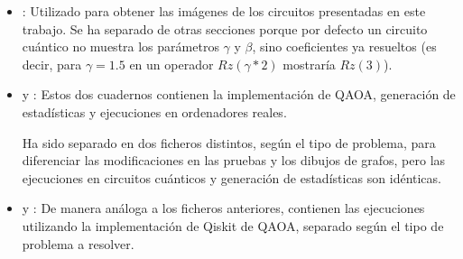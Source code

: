\begin{itemize}
\item {}: Utilizado para obtener las imágenes de los circuitos presentadas en este trabajo.
  Se ha separado de otras secciones porque por defecto un circuito cuántico no muestra los parámetros $\gamma$ y $\beta$, sino coeficientes ya resueltos (es decir, para $\gamma = 1.5$ en un operador $Rz(\gamma*2)$ mostraría $Rz(3)$).

\item {} y : Estos dos cuadernos contienen la implementación de QAOA, generación de estadísticas y ejecuciones en ordenadores reales.
  
  Ha sido separado en dos ficheros distintos, según el tipo de problema, para diferenciar las modificaciones en las pruebas y los dibujos de grafos, pero las ejecuciones en circuitos cuánticos y generación de estadísticas son idénticas.
  
\item {} y : De manera análoga a los ficheros anteriores, contienen las ejecuciones utilizando la implementación de Qiskit de QAOA, separado según el tipo de problema a resolver.
\end{itemize}


